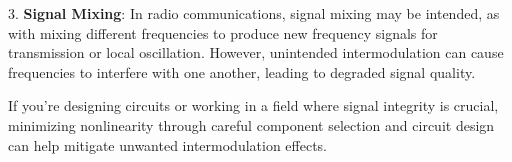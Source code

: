 3. \textbf{Signal Mixing}: In radio communications, signal mixing may be intended, as with mixing different frequencies to produce new frequency signals for transmission or local oscillation. However, unintended intermodulation can cause frequencies to interfere with one another, leading to degraded signal quality.

If you're designing circuits or working in a field where signal integrity is crucial, minimizing nonlinearity through careful component selection and circuit design can help mitigate unwanted intermodulation effects. 

